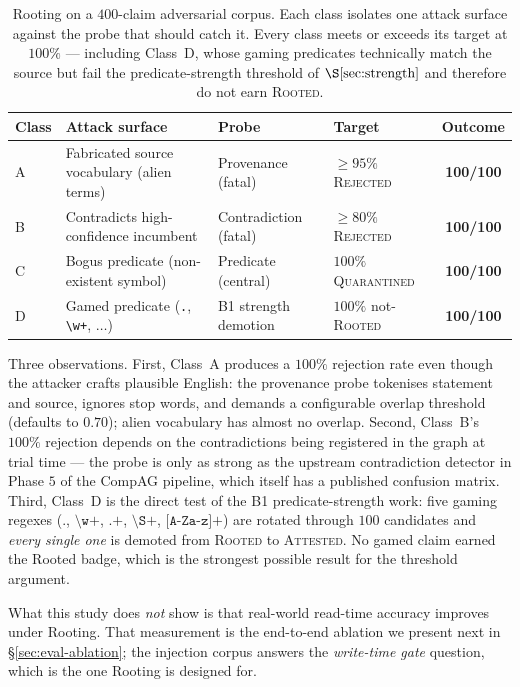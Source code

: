 \documentclass[10pt,a4paper]{article}
\begin{document}
\begin{table}[t]
\centering
\footnotesize
\caption{Rooting on a $400$-claim adversarial corpus. Each class
isolates one attack surface against the probe that should catch it.
Every class meets or exceeds its target at $100\%$ --- including
Class~D, whose gaming predicates technically match the source but fail
the predicate-strength threshold of $\S\ref{sec:strength}$ and therefore
do not earn \textsc{Rooted}.}
\label{tab:injection}
\begin{tabular}{@{}llllc@{}}
\toprule
Class & Attack surface & Probe & Target & Outcome \\
\midrule
A & Fabricated source vocabulary (alien terms) & Provenance (fatal) & $\geq 95\%$ \textsc{Rejected} & \textbf{100/100} \\
B & Contradicts high-confidence incumbent  & Contradiction (fatal) & $\geq 80\%$ \textsc{Rejected} & \textbf{100/100} \\
C & Bogus predicate (non-existent symbol)   & Predicate (central) & $100\%$ \textsc{Quarantined} & \textbf{100/100} \\
D & Gamed predicate (\texttt{.}, \texttt{\textbackslash w+}, $\ldots$) & B1 strength demotion & $100\%$ not-\textsc{Rooted} & \textbf{100/100} \\
\bottomrule
\end{tabular}
\end{table}

Three observations. First, Class~A produces a $100\%$ rejection rate
even though the attacker crafts plausible English: the provenance probe
tokenises statement and source, ignores stop words, and demands a
configurable overlap threshold (defaults to $0.70$); alien vocabulary
has almost no overlap. Second, Class~B's $100\%$ rejection depends on
the contradictions being registered in the graph at trial time --- the
probe is only as strong as the upstream contradiction detector in Phase
$5$ of the CompAG pipeline, which itself has a published confusion
matrix. Third, Class~D is the direct test of the B1 predicate-strength
work: five gaming regexes ($\texttt{.}$, $\texttt{\textbackslash w+}$,
$\texttt{.+}$, $\texttt{\textbackslash S+}$, $\texttt{[A-Za-z]+}$) are
rotated through $100$ candidates and \emph{every single one} is demoted
from \textsc{Rooted} to \textsc{Attested}. No gamed claim earned the
Rooted badge, which is the strongest possible result for the threshold
argument.

What this study does \emph{not} show is that real-world read-time
accuracy improves under Rooting. That measurement is the
end-to-end ablation we present next in \S\ref{sec:eval-ablation}; the
injection corpus answers the \emph{write-time gate} question, which is
the one Rooting is designed for.
\end{document}
